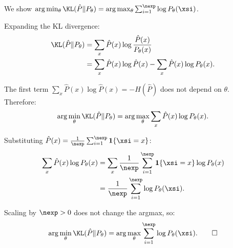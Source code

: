 \begin{answer}
We show $\arg\min_\theta \KL(\hat{P}\|P_\theta) = \arg\max_\theta \sum_{i=1}^\nexp \log P_\theta(\xsi)$.

Expanding the KL divergence:
\begin{align*}
\KL(\hat{P}\|P_\theta)
&= \sum_x \hat{P}(x)\log\frac{\hat{P}(x)}{P_\theta(x)} \\
&= \sum_x \hat{P}(x)\log \hat{P}(x) - \sum_x \hat{P}(x)\log P_\theta(x).
\end{align*}

The first term $\sum_x \hat{P}(x)\log\hat{P}(x) = -H(\hat{P})$ does not depend on $\theta$. Therefore:
$$\arg\min_\theta \KL(\hat{P}\|P_\theta) = \arg\max_\theta \sum_x \hat{P}(x)\log P_\theta(x).$$

Substituting $\hat{P}(x) = \frac{1}{\nexp}\sum_{i=1}^\nexp \mathbf{1}\{\xsi = x\}$:
\begin{align*}
\sum_x \hat{P}(x)\log P_\theta(x)
&= \sum_x \frac{1}{\nexp}\sum_{i=1}^\nexp \mathbf{1}\{\xsi = x\}\log P_\theta(x) \\
&= \frac{1}{\nexp}\sum_{i=1}^\nexp \log P_\theta(\xsi).
\end{align*}

Scaling by $\nexp > 0$ does not change the argmax, so:
$$\arg\min_\theta \KL(\hat{P}\|P_\theta) = \arg\max_\theta \sum_{i=1}^\nexp \log P_\theta(\xsi). \qquad \square$$
\end{answer}

